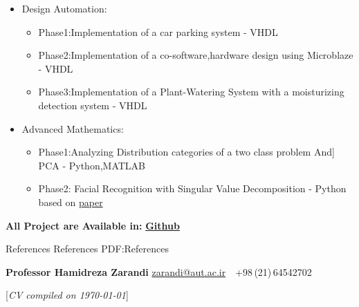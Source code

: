 \documentclass[letterpaper,MMMyyyy,nonstopmode]{simpleresumecv}
\newcommand{\CVNote}{CV compiled on {\today}}
\begin{document}
\begin{Body}
\begin{itemize}
	
	\item Design Automation:
		\begin{itemize}
		\item Phase1:Implementation of a car parking system - VHDL
     	\item Phase2:Implementation of a co-software,hardware design using
     	      Microblaze - VHDL
	    \item Phase3:Implementation of a Plant-Watering System with a moisturizing
	          detection system - VHDL
	          
	
	\end{itemize}
	
		
    \item Advanced Mathematics: 
	    \begin{itemize}
        \item Phase1:Analyzing Distribution categories of a two class  problem And] PCA - Python,MATLAB
		 \item Phase2:
     	     Facial Recognition with Singular Value Decomposition - Python
     	     based on 	\href{https://link.springer.com/chapter/10.1007/978-1-4020-6264-3_26}{paper}
     \end{itemize}
   	\end{itemize}
   \Entry
\textbf{All Project are Available in:}
\newline
\href{https://github.com/z-dehghanian}
{\textbf{Github}}  

       	



\Section
{References}
{References}
{PDF:References}

\BulletItem
\textbf{Professor Hamidreza Zarandi}
\newline
\href{mailto:zarandi@aut.ac.ir}
{zarandi@aut.ac.ir}
\,\SubBulletSymbol\,
+98\,(21)\,64542702
\biggap



\end{Body}


\UseNoteFont%
\null\hfill%
[\textit{\CVNote}]
\end{document}
